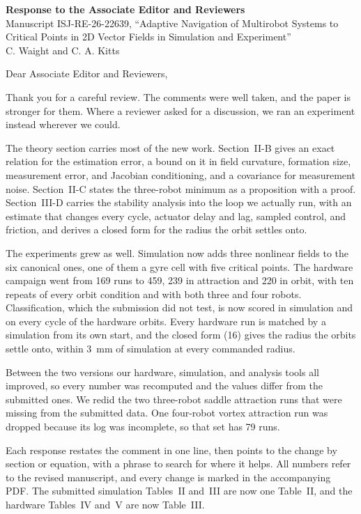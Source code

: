 \documentclass[10pt]{article}
\newcommand{\rev}[1]{#1}                             %
\begin{document}
\begin{center}
{\large\bfseries Response to the Associate Editor and Reviewers}\\[3pt]
Manuscript ISJ-RE-26-22639, ``Adaptive Navigation of Multirobot Systems to Critical Points in 2D Vector Fields in Simulation and Experiment''\\[2pt]
C. Waight and C. A. Kitts
\end{center}

Dear Associate Editor and Reviewers,

Thank you for a careful review. The comments were well taken, and the paper is stronger for them. Where a reviewer asked for a discussion, we ran an experiment instead wherever we could.

The theory section carries most of the new work. Section~II-B gives an exact relation for the estimation error, a bound on it in field curvature, formation size, measurement error, and Jacobian conditioning, and a covariance for measurement noise. Section~II-C states the three-robot minimum as a proposition with a proof. Section~III-D carries the stability analysis into the loop we actually run, with an estimate that changes every cycle, actuator delay and lag, sampled control, and friction, and derives a closed form for the radius the orbit settles onto.

The experiments grew as well. Simulation now adds three nonlinear fields to the six canonical ones, one of them a gyre cell with five critical points. The hardware campaign went from 169 runs to \rev{459}, \rev{239} in attraction and \rev{220} in orbit, with ten repeats of every orbit condition and with both three and four robots. Classification, which the submission did not test, is now scored in simulation and on every cycle of the hardware orbits. Every hardware run is matched by a simulation from its own start, and the closed form (16) gives the radius the orbits settle onto, within \rev{3}~mm of simulation at every commanded radius.

Between the two versions our hardware, simulation, and analysis tools all improved, so every number was recomputed and the values differ from the submitted ones. We redid the two three-robot saddle attraction runs that were missing from the submitted data. One four-robot vortex attraction run was dropped because its log was incomplete, so that set has 79 runs.

Each response restates the comment in one line, then points to the change by section or equation, with a phrase to search for where it helps. All numbers refer to the revised manuscript, and every change is marked in the accompanying PDF. The submitted simulation Tables~II and~III are now one Table~II, and the hardware Tables~IV and~V are now Table~III.
\end{document}
